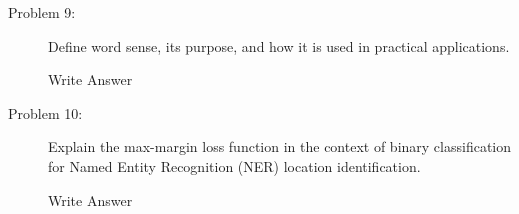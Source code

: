 \documentclass[12pt]{article}
\begin{document}
\begin{description}
  \pagebreak

  \item[Problem 9:] Define word sense, its purpose, and how it is used in practical applications.
  
  Write Answer

  \pagebreak

  \item[Problem 10:] Explain the max-margin loss function in the context of binary classification for Named Entity Recognition (NER) location identification.
  
  Write Answer

  \pagebreak
  
\end{description}
\end{document}
